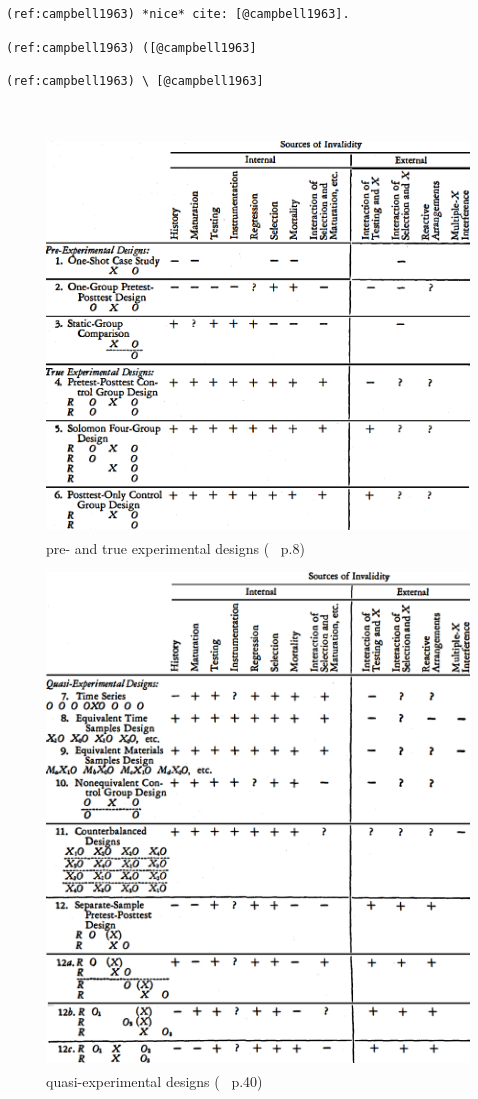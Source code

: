 \documentclass[
]{book}
\theoremstyle{definition}
\theoremstyle{definition}
\theoremstyle{definition}
\theoremstyle{definition}
\theoremstyle{remark}
\begin{document}
\texttt{(ref:campbell1963)\ *nice*\ cite:\ {[}@campbell1963{]}.}

\texttt{(ref:campbell1963)\ ({[}@campbell1963{]}}

\texttt{(ref:campbell1963)\ \textbackslash{}\ {[}@campbell1963{]}}

~\textsuperscript{} ~\textsuperscript{}

\begin{figure}
\includegraphics[width=0.65\linewidth]{img/pre-and-true-experimental-designs} \caption{pre- and true experimental designs (~\textsuperscript{} p.8)}\label{fig:unnamed-chunk-1}
\end{figure}

\begin{figure}
\includegraphics[width=0.65\linewidth]{img/quasi-experimental-designs} \caption{quasi-experimental designs (~\textsuperscript{} p.40)}\label{fig:unnamed-chunk-2}
\end{figure}
\end{document}
